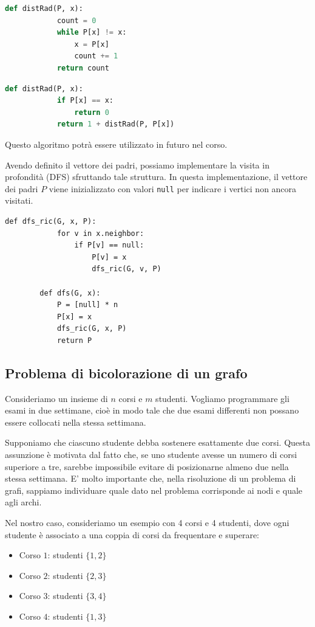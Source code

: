 \documentclass[12pt]{report}
\begin{document}
	\begin{lstlisting}[language=Python, caption={Risoluzione iterativa}]
		def distRad(P, x):
			count = 0
			while P[x] != x:
				x = P[x]
				count += 1
			return count
	\end{lstlisting}
	
	\begin{lstlisting}[language=Python, caption={Risoluzione ricorsiva}]
		def distRad(P, x):
			if P[x] == x:
				return 0
			return 1 + distRad(P, P[x])
	\end{lstlisting}
	
	Questo algoritmo potrà essere utilizzato in futuro nel corso.
	
	Avendo definito il vettore dei padri, possiamo implementare la visita in profondità (DFS) sfruttando tale struttura. In questa implementazione, il vettore dei padri $P$ viene inizializzato con valori \texttt{null} per indicare i vertici non ancora visitati.
	
	\begin{lstlisting}[style=stile-listings, caption={Algoritmo DFS con vettore dei padri}]
		def dfs_ric(G, x, P):
			for v in x.neighbor:
				if P[v] == null:
					P[v] = x
					dfs_ric(G, v, P)
				
		def dfs(G, x):
			P = [null] * n
			P[x] = x
			dfs_ric(G, x, P)
			return P
	\end{lstlisting}
	
	\subsection{Problema di bicolorazione di un grafo}
	Consideriamo un insieme di $n$ corsi e $m$ studenti. Vogliamo programmare gli esami in due settimane, cioè in modo tale che due esami differenti non possano essere collocati nella stessa settimana. 
	
	Supponiamo che ciascuno studente debba sostenere esattamente due corsi. Questa assunzione è motivata dal fatto che, se uno studente avesse un numero di corsi superiore a tre, sarebbe impossibile evitare di posizionarne almeno due nella stessa settimana.
	\smallbreak
	E' molto importante che, nella risoluzione di un problema di grafi, sappiamo individuare quale dato nel problema corrisponde ai nodi e quale agli archi.
	
	Nel nostro caso, consideriamo un esempio con 4 corsi e 4 studenti, dove ogni studente è associato a una coppia di corsi da frequentare e superare:
	
	\begin{itemize}
		\item Corso $1$: studenti $\{1, 2\}$
		\item Corso $2$: studenti $\{2, 3\}$
		\item Corso $3$: studenti $\{3, 4\}$
		\item Corso $4$: studenti $\{1, 3\}$
	\end{itemize}
	
\end{document}
